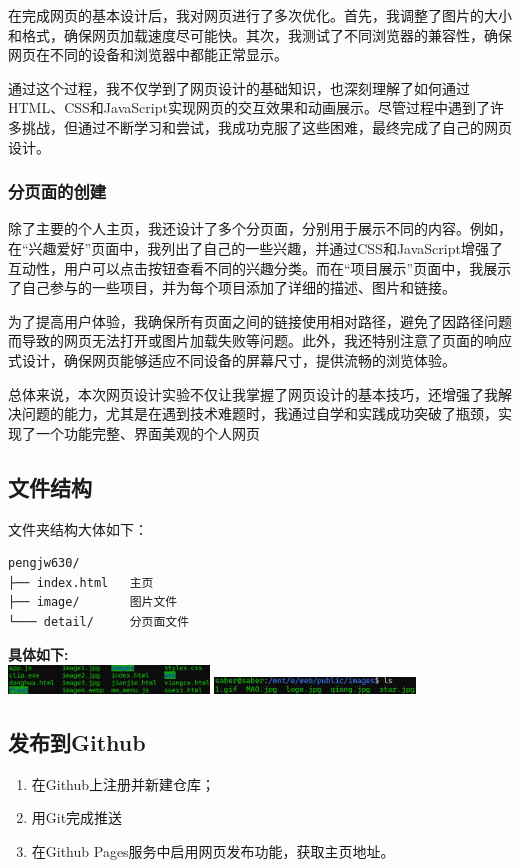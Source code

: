 \documentclass[a4paper,12pt]{article}
\begin{document}
在完成网页的基本设计后，我对网页进行了多次优化。首先，我调整了图片的大小和格式，确保网页加载速度尽可能快。其次，我测试了不同浏览器的兼容性，确保网页在不同的设备和浏览器中都能正常显示。

通过这个过程，我不仅学到了网页设计的基础知识，也深刻理解了如何通过HTML、CSS和JavaScript实现网页的交互效果和动画展示。尽管过程中遇到了许多挑战，但通过不断学习和尝试，我成功克服了这些困难，最终完成了自己的网页设计。

\subsubsection{分页面的创建}
除了主要的个人主页，我还设计了多个分页面，分别用于展示不同的内容。例如，在“兴趣爱好”页面中，我列出了自己的一些兴趣，并通过CSS和JavaScript增强了互动性，用户可以点击按钮查看不同的兴趣分类。而在“项目展示”页面中，我展示了自己参与的一些项目，并为每个项目添加了详细的描述、图片和链接。

为了提高用户体验，我确保所有页面之间的链接使用相对路径，避免了因路径问题而导致的网页无法打开或图片加载失败等问题。此外，我还特别注意了页面的响应式设计，确保网页能够适应不同设备的屏幕尺寸，提供流畅的浏览体验。

总体来说，本次网页设计实验不仅让我掌握了网页设计的基本技巧，还增强了我解决问题的能力，尤其是在遇到技术难题时，我通过自学和实践成功突破了瓶颈，实现了一个功能完整、界面美观的个人网页

\subsection{文件结构}
文件夹结构大体如下：
\begin{verbatim}
pengjw630/  
├── index.html   主页
├── image/       图片文件
└─── detail/     分页面文件
\end{verbatim}
\textbf{具体如下:}\\
\includegraphics[width=0.4\textwidth]{1.png}
\includegraphics[width=0.4\textwidth]{2.png}


\subsection{发布到Github}
\begin{enumerate}
    \item 在Github上注册并新建仓库；
    \item 用Git完成推送
    \item 在Github Pages服务中启用网页发布功能，获取主页地址。
\end{enumerate}
\end{document}
